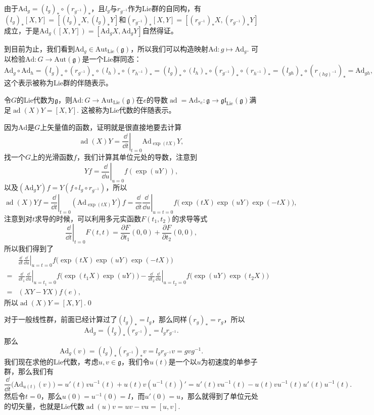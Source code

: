 \documentclass[9pt]{extarticle}
\newcommand{\lag}{{\mathfrak{g}}}
\DeclareMathOperator{\ad}{ad}
\begin{document}
由于$\mathrm{Ad}_g=(l_g)_*\circ (r_{g^{-1}})_*$，且$l_g$与$r_{g^{-1}}$作为Lie群的自同构，有$(l_g)_*[X,Y]=[(l_g)_*X,(l_g)_*Y]$和$(r_{g^{-1}})_*[X,Y]=[(r_{g^{-1}})_*X,(r_{g^{-1}})_*Y]$成立，于是$\mathrm{Ad}_g([X,Y])=[\mathrm{Ad}_gX,\mathrm{Ad}_gY]$自然得证。

\para 到目前为止，我们看到$\mathrm{Ad}_g\in \mathrm{Aut}_{\mathrm{Lie}}(\lag)$，所以我们可以构造映射$\mathrm{Ad}:g\mapsto \mathrm{Ad}_g$. 可以检验$\mathrm{Ad}:G\to \mathrm{Aut}(\lag)$是一个Lie群同态：
\[\mathrm{Ad}_g\circ \mathrm{Ad}_h=(l_g)_*\circ (r_{g^{-1}})_*\circ (l_h)_*\circ (r_{h^{-1}})_*=(l_g)_*\circ (l_h)_*\circ (r_{g^{-1}})_*\circ (r_{h^{-1}})_*=(l_{gh})_*\circ (r_{(hg)^{-1}})_*=\mathrm{Ad}_{gh},\]
这个表示被称为Lie群的伴随表示。


\pro 令$G$的Lie代数为$\lag$，则$\mathrm{Ad}:G\to \mathrm{Aut}_{\mathrm{Lie}}(\lag)$在$e$的导数$\ad=\mathrm{Ad}_{*e}:\lag\to \mathfrak{gl}_{\mathrm{Lie}}(\lag)$满足$\ad(X)Y=[X,Y]$. 这被称为Lie代数的伴随表示。

\proof 因为$\mathrm{Ad}$是$G$上矢量值的函数，证明就是很直接地要去计算
\[
	\ad(X)Y=\left.\frac{\dd}{\dd t}\right|_{t=0}\mathrm{Ad}_{\exp(tX)}Y,
\]
找一个$G$上的光滑函数$f$，我们计算其单位元处的导数，注意到
\[
	Yf=\left.\frac{\dd}{\dd u}\right|_{u=0}f(\exp(uY)),
\]
以及$(\mathrm{Ad}_{g}Y)f=Y(f\circ l_g\circ r_{g^{-1}})$，所以
\[
	\ad(X)Yf=\left.\frac{\dd}{\dd t}\right|_{t=0}(\mathrm{Ad}_{\exp(tX)}Y)f=\left.\frac{\dd}{\dd t}\frac{\dd}{\dd u}\right|_{u=t=0}f\bigl(\exp(tX)\exp(uY)\exp(-tX)\bigr),
\]
注意到对$t$求导的时候，可以利用多元实函数$F(t_1,t_2)$的求导等式
\[
	\left.\frac{\dd}{\dd t}\right|_{t=0}F(t,t)=\frac{\partial F}{\partial t_1}(0,0)+\frac{\partial F}{\partial t_2}(0,0),
\]
所以我们得到了
\[
\begin{split}
	&\left.\frac{\dd}{\dd t}\frac{\dd}{\dd u}\right|_{u=t=0}f\bigl(\exp(tX)\exp(uY)\exp(-tX)\bigr)\\
	=&\left.\frac{\dd}{\dd t_1}\frac{\dd}{\dd u}\right|_{u=t_1=0}f\bigl(\exp(t_1X)\exp(uY)\bigr)-\left.\frac{\dd}{\dd t_2}\frac{\dd}{\dd u}\right|_{u=t_2=0}f\bigl(\exp(uY)\exp(t_2X)\bigr)\\
	=&(XY-YX)f(e),
\end{split}
\]
所以$\ad(X)Y=[X,Y]$.\qed

\para 对于一般线性群，前面已经计算过了$(l_g)_*=l_g$，那么同样$(r_g)_*=r_g$，所以
\[
	\mathrm{Ad}_g=(l_g)_*(r_{g^{-1}})_*=l_gr_{g^{-1}}.
\]
那么
\[
	\mathrm{Ad}_g(v)=(l_g)_*(r_{g^{-1}})_*v=l_gr_{g^{-1}}v=gvg^{-1}.
\]
我们现在求他的Lie代数，考虑$u,v\in \lag$，我们令$u(t)$是一个以$u$为初速度的单参子群，那么我们有
\[
	\frac{\dd}{\dd t}\bigl(\mathrm{Ad}_{u(t)}(v)\bigr)=u'(t)vu^{-1}(t)+u(t)v(u^{-1}(t))'=u'(t)vu^{-1}(t)-u(t)vu^{-1}(t)u'(t)u^{-1}(t).
\]
然后令$t=0$，那么$u(0)=u^{-1}(0)=I$，而$u'(0)=u$，那么就得到了单位元处的切矢量，也就是Lie代数$\ad(u)v=uv-vu=[u,v]$.
\end{document}
